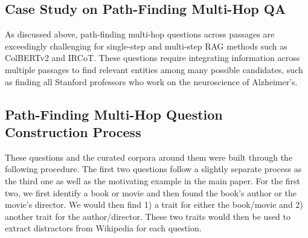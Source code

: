 \documentclass{article}
\begin{document}
\begin{appendices}

\section{Case Study on Path-Finding Multi-Hop QA}
\label{sec:path-finding-case-study}

As discussed above, path-finding multi-hop questions across passages are exceedingly challenging for single-step and multi-step RAG methods such as ColBERTv2 and IRCoT. These questions require integrating information across multiple passages to find relevant entities among many possible candidates, such as finding all Stanford professors who work on the neuroscience of Alzheimer's. 

\subsection{Path-Finding Multi-Hop Question Construction Process}

These questions and the curated corpora around them were built through the following procedure. The first two questions follow a slightly separate process as the third one as well as the motivating example in the main paper. For the first two, we first identify a book or movie and then found the book's author or the movie's director. We would then find 1) a trait for either the book/movie and 2) another trait for the author/director. These two traits would then be used to extract distractors from Wikipedia for each question. 


\end{appendices}
\end{document}
